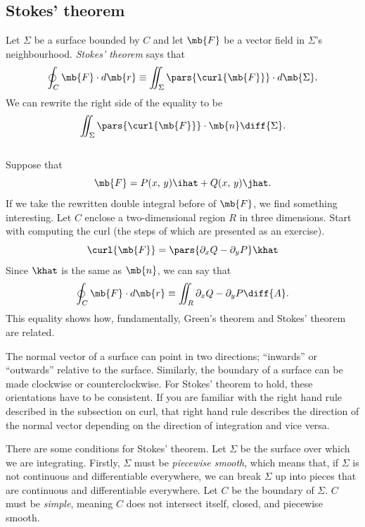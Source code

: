 \documentclass[11pt]{article}
\theoremstyle{definition}
\begin{document}
\subsection{Stokes' theorem}
Let $\Sigma$ be a surface bounded by $C$ and let $\mb{F}$ be a vector field in $\Sigma$'s neighbourhood. \textit{Stokes' theorem} says that 
$$
\oint_C\mb{F}\cdot d\mb{r} \equiv \iint_\Sigma \pars{\curl{\mb{F}}}\cdot d\mb{\Sigma}.
$$
We can rewrite the right side of the equality to be 
$$
\iint_\Sigma \pars{\curl{\mb{F}}} \cdot \mb{n}\diff{\Sigma}.
$$\\


Suppose that 
$$
\mb{F} = P(x,\,y)\ihat+ Q(x,\,y)\jhat.
$$
If we take the rewritten double integral before of $\mb{F}$, we find something interesting. Let $C$ enclose a two-dimensional region $R$ in three dimensions. Start with computing the curl (the steps of which are presented as an exercise).
$$
\curl{\mb{F}} = \pars{\partial_xQ -\partial_yP}\khat
$$
Since $\khat$ is the same as $\mb{n}$, we can say that
$$
\oint_C\mb{F}\cdot d\mb{r} \equiv \iint_R \partial_x Q - \partial_y P \diff{A}.
$$
This equality shows how, fundamentally, Green's theorem and Stokes' theorem are related.


The normal vector of a surface can point in two directions; ``inwards'' or ``outwards'' relative to the surface. Similarly, the boundary of a surface can be made clockwise or counterclockwise. For Stokes' theorem to hold, these orientations have to be consistent. If you are familiar with the right hand rule described in the subsection on curl, that right hand rule describes the direction of the normal vector depending on the direction of integration and vice versa.


There are some conditions for Stokes' theorem. Let $\Sigma$ be the surface over which we are integrating. Firstly, $\Sigma$ must be \textit{piecewise smooth}, which means that, if $\Sigma$ is not continuous and differentiable everywhere, we can break $\Sigma$ up into pieces that are continuous and differentiable everywhere. Let $C$ be the boundary of $\Sigma$. $C$ must be \textit{simple}, meaning $C$ does not intersect itself, closed, and piecewise smooth.
\end{document}
